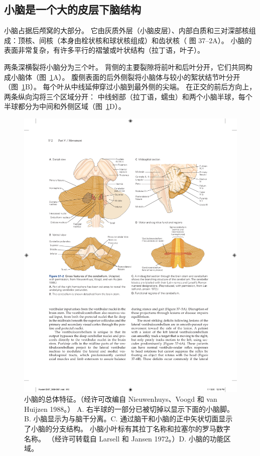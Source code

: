 \subsection{小脑是一个大的皮层下脑结构}

小脑占据后颅窝的大部分。
它由灰质外层（小脑皮层）、内部白质和三对深部核组成：顶核、间核（本身由栓状核和球状核组成）和齿状核（ 图 37–2A）。
小脑的表面非常复杂，有许多平行的褶皱或叶状结构（拉丁语，叶子）。


两条深横裂将小脑分为三个叶。
背侧的主要裂隙将前叶和后叶分开，它们共同构成小脑体（图~\ref{fig:37_2}A）。
腹侧表面的后外侧裂将小脑体与较小的絮状结节叶分开（图~\ref{fig:37_2}B）。
每个叶从中线延伸穿过小脑到最外侧的尖端。
在正交的前后方向上，两条纵向沟将三个区域分开：
中线蚓部（拉丁语，蠕虫）和两个小脑半球，每个半球都分为中间和外侧区域（图~\ref{fig:37_2}D）。


\begin{figure}[htbp]
	\centering
	\includegraphics[width=0.9\linewidth]{chap37/fig_37_2}
	\caption{小脑的总体特征。（经许可改编自 Nieuwenhuys、Voogd 和 van Huijzen 1988。） A. 右半球的一部分已被切掉以显示下面的小脑脚。B. 小脑显示为与脑干分离。C. 通过脑干和小脑的正中矢状切面显示了小脑的分支结构。 小脑小叶标有其拉丁名称和拉塞尔的罗马数字名称。 （经许可转载自 Larsell 和 Jansen 1972。）D. 小脑的功能区域。}
	\label{fig:37_2}
\end{figure}



